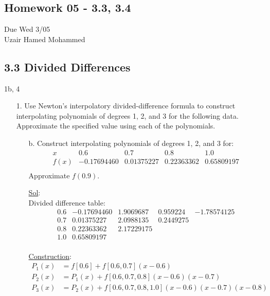 \begin{center}
  \section*{Homework 05 - 3.3, 3.4}
  Due Wed 3/05 \\
  Uzair Hamed Mohammed
\end{center}

\subsection*{3.3 Divided Differences}

1b, 4

\begin{enumerate}
  \item[1.] Use Newton's interpolatory divided-difference formula to
    construct interpolating polynomials of degrees 1, 2, and 3 for
    the following data. Approximate the specified value using each of
    the polynomials.
    \begin{enumerate}
      \item[b.]
        Construct interpolating polynomials of degrees 1, 2, and 3 for:
        \[
          \begin{array}{c|cccc}
            x & 0.6 & 0.7 & 0.8 & 1.0 \\
            \hline
            f(x) & -0.17694460 & 0.01375227 & 0.22363362 & 0.65809197 \\
          \end{array}
        \]
        Approximate \( f(0.9) \).

        \underline{Sol}:\\

        Divided difference table:
        \[
          \begin{array}{c|cccc}
            0.6 & -0.17694460 & 1.9069687 & 0.959224 & -1.78574125 \\
            0.7 & 0.01375227 & 2.0988135 & 0.2449275 & \\
            0.8 & 0.22363362 & 2.17229175 & & \\
            1.0 & 0.65809197 & & & \\
          \end{array}
        \]

        \underline{Construction}:
        \[
          \begin{aligned}
            P_1(x) &= f[0.6] + f[0.6,0.7](x-0.6) \\
            P_2(x) &= P_1(x) + f[0.6,0.7,0.8](x-0.6)(x-0.7) \\
            P_3(x) &= P_2(x) + f[0.6,0.7,0.8,1.0](x-0.6)(x-0.7)(x-0.8)
          \end{aligned}
        \]


\end{enumerate}
\end{enumerate}
